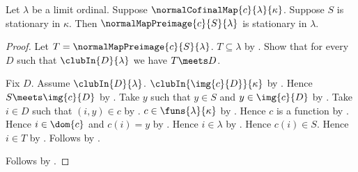 \begin{theorem}\label{normal_cofinal_map_stationary_pullback}
    Let $\lambda$ be a limit ordinal.
    Suppose $\normalCofinalMap{c}{\lambda}{\kappa}$.
    Suppose $S$ is stationary in $\kappa$.
    Then $\normalMapPreimage{c}{S}{\lambda}$ is stationary in $\lambda$.
\end{theorem}
\begin{proof}
    Let $T=\normalMapPreimage{c}{S}{\lambda}$.
    $T\subseteq\lambda$ by .
    Show that for every $D$ such that $\clubIn{D}{\lambda}$
        we have $T\meets D$.
    \begin{subproof}
        Fix $D$.
        Assume $\clubIn{D}{\lambda}$.
        $\clubIn{\img{c}{D}}{\kappa}$
            by .
        Hence $S\meets\img{c}{D}$ by .
        Take $y$ such that $y\in S$ and $y\in\img{c}{D}$
            by .
        Take $i\in D$ such that $(i,y)\in c$ by .
        $c\in\funs{\lambda}{\kappa}$
            by .
        Hence $c$ is a function by .
        Hence $i\in\dom{c}$ and $c(i)=y$
            by .
        Hence $i\in\lambda$ by .
        Hence $c(i)\in S$.
        Hence $i\in T$ by .
        Follows by .
    \end{subproof}
    Follows by .
\end{proof}
